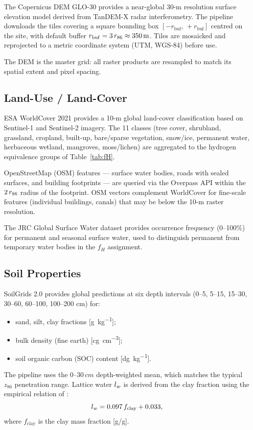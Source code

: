 The Copernicus DEM GLO-30 \citep{copernicus_dem} provides a
near-global 30-m resolution surface elevation model derived from
TanDEM-X radar interferometry.
The pipeline downloads the tiles covering a square bounding box
$[{-}r_\mathrm{buf},\,{+}r_\mathrm{buf}]$ centred on the site,
with default buffer $r_\mathrm{buf} = 3\,r_{86} \approx \SI{350}{m}$.
Tiles are mosaicked and reprojected to a metric coordinate system
(UTM, WGS-84) before use.

The DEM is the master grid: all raster products are resampled to
match its spatial extent and pixel spacing.

\subsection{Land-Use / Land-Cover}

ESA WorldCover 2021 \citep{worldcover2021} provides a 10-m global
land-cover classification based on Sentinel-1 and Sentinel-2
imagery.
The 11 classes (tree cover, shrubland, grassland, cropland,
built-up, bare/sparse vegetation, snow/ice, permanent water,
herbaceous wetland, mangroves, moss/lichen) are aggregated to the
hydrogen equivalence groups of Table~\ref{tab:fH}.

OpenStreetMap (OSM) features — surface water bodies, roads with
sealed surfaces, and building footprints — are queried via the
Overpass API within the $2\,r_{86}$ radius of the footprint.
OSM vectors complement WorldCover for fine-scale features
(individual buildings, canals) that may be below the 10-m raster
resolution.

The JRC Global Surface Water dataset \citep{pekel2016} provides
occurrence frequency (0–100\%) for permanent and seasonal surface
water, used to distinguish permanent from temporary water bodies
in the $f_H$ assignment.

\subsection{Soil Properties}

SoilGrids 2.0 \citep{soilgrids2020} provides global predictions at
six depth intervals (0–5, 5–15, 15–30, 30–60, 60–100, 100–200 cm)
for:
\begin{itemize}[nosep]
  \item sand, silt, clay fractions [\si{\gram\per\kilo\gram}];
  \item bulk density (fine earth) [\si{\centi\gram\per\cubic\centi\metre}];
  \item soil organic carbon (SOC) content [\si{\deci\gram\per\kilo\gram}].
\end{itemize}
The pipeline uses the $0$–$30\,\si{cm}$ depth-weighted mean, which
matches the typical $z_{86}$ penetration range.
Lattice water $l_w$ is derived from the clay fraction using the
empirical relation of \citet{kohli2021}:
\begin{equation}
  l_w = 0.097\,f_\mathrm{clay} + 0.033,
  \label{eq:lw_clay}
\end{equation}
where $f_\mathrm{clay}$ is the clay mass fraction [\si{g/g}].

